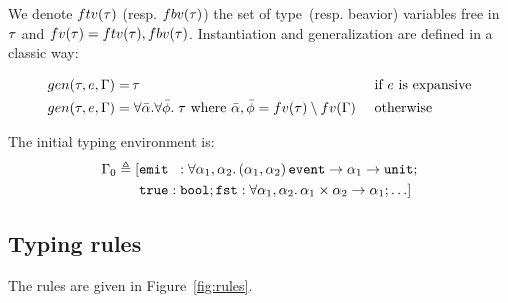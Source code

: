 \documentclass[9pt,preprint]{sigplanconf}
\newcommand{\deq}{\triangleq}
\begin{document}
We denote $ftv(\tau)$ (resp. $fbv(\tau)$) the set of type~(resp. beavior) variables free in $\tau$ and $fv(\tau) = ftv(\tau), fbv(\tau)$. Instantiation and generalization are defined in a classic way:
\vspace{-1.3em}
\begin{align*}
gen(\tau, e, \Gamma) = &\, \tau && \text { if $e$ is expansive} \\
gen(\tau, e, \Gamma) = &\; \forall \bar{\alpha}.\forall \bar{\phi}.\; \tau 
   \text{ where }  \bar{\alpha}, \bar{\phi} = fv(\tau) \setminus fv(\Gamma)  
   && \text{ otherwise } 
\end{align*}

The initial typing environment is: 
\begin{align*}
\Gamma_0 \deq [
 &\eemit{}{} : \forall  \rtvar_1, \rtvar_2. \, 
        \rtarrow{ \rtsig{\rtvar_1}{\rtvar_2} }{\rtarrow{\rtvar_1}{\unit{}} }; \\
        &\mathtt{true} : \mathtt{bool};
              \mathtt{fst} : \forall \rtvar_1, \rtvar_2.\, \rtarrow{\rtprod{\rtvar_1}{\rtvar_2}}{\rtvar_1};  \ldots ]
\end{align*}

\subsection{Typing rules}

\begin{figure*}
\begin{small}

\end{small}

\caption{Type-and-effect rules}
\label{fig:rules}
\end{figure*}

The rules are given in Figure~\ref{fig:rules}.
\end{document}
